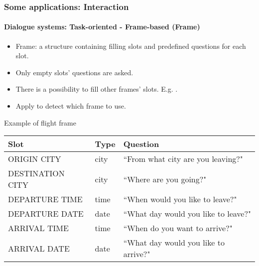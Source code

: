 \documentclass[xcolor=table]{beamer}
\begin{document}
\begin{frame}
	\frametitle{Some applications: Interaction}
	\framesubtitle{Dialogue systems: Task-oriented - Frame-based (Frame)}
	
	\begin{itemize}
		\item Frame: a structure containing filling slots and predefined questions for each slot.
		\item Only empty slots' questions are asked.
		\item There is a possibility to fill other frames' slots. 
		E.g. .
		\item Apply  to detect which frame to use.
	\end{itemize}

	\begin{exampleblock}{Example of flight frame \cite{2020-jurafsky-martin}}
		\centering\tiny\bfseries
		\begin{tabular}{lll}
			\hline\hline
			Slot & Type & Question \\
			\hline
			ORIGIN CITY & city & ``From what city are you leaving?" \\
			DESTINATION CITY & city & ``Where are you going?" \\
			DEPARTURE TIME & time & ``When would you like to leave?" \\
			DEPARTURE DATE & date & ``What day would you like to leave?" \\
			ARRIVAL TIME & time & ``When do you want to arrive?" \\
			ARRIVAL DATE & date & ``What day would you like to arrive?" \\
			\hline\hline
		\end{tabular}
	\end{exampleblock}
	
\end{frame}
\end{document}
